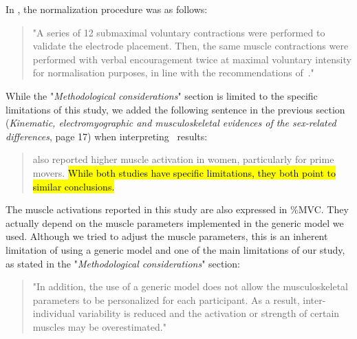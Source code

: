 \documentclass[preprint,review,12pt]{elsarticle}
\begin{document}
    In \citet{Bouffard2019-fd}, the normalization procedure was as follows:
    \begin{quote}
        "A series of 12 submaximal voluntary contractions were performed to validate the electrode placement.
        Then, the same muscle contractions were performed with verbal encouragement twice at maximal voluntary intensity for normalisation purposes, in line with the recommendations of~\citet{Dal_Maso2016-wh}."
    \end{quote}

    While the "\textit{Methodological considerations}" section is limited to the specific limitations of this study, we added the following sentence in the previous section (\textit{Kinematic, electromyographic and musculoskeletal evidences of the sex-related differences}, page 17) when interpreting~\citet{Bouffard2019-fd} results:

    \begin{quote}
        \citet{Bouffard2019-fd} also reported higher muscle activation in women, particularly for prime movers.
        \hl{While both studies have specific limitations, they both point to similar conclusions.}
    \end{quote}

    The muscle activations reported in this study are also expressed in \%MVC\@.
    They actually depend on the muscle parameters implemented in the generic model we used.
    Although we tried to adjust the muscle parameters, this is an inherent limitation of using a generic model and one of the main limitations of our study, as stated in the "\textit{Methodological considerations}" section:

    \begin{quote}
        "In addition, the use of a generic model does not allow the musculoskeletal parameters to be personalized for each participant.
        As a result, inter-individual variability is reduced and the activation or strength of certain muscles may be overestimated."
    \end{quote}

    
\end{document}
